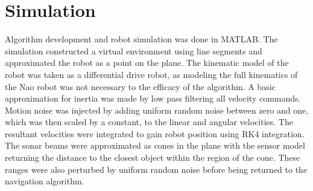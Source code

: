 \chapter{Simulation}
Algorithm development and robot simulation was done in MATLAB. The simulation constructed a virtual environment using line segments and approximated the robot as a point on the plane. The kinematic model of the robot was taken as a differential drive robot, as modeling the full kinematics of the Nao robot was not necessary to the efficacy of the algorithm. A basic approximation for inertia was made by low pass filtering all velocity commands. Motion noise was injected by adding uniform random noise between zero and one, which was then scaled by a constant, to the linear and angular velocities. The resultant velocities were integrated to gain robot position using RK4 integration.
The sonar beams were approximated as cones in the plane with the sensor model returning the distance to the closest object within the region of the cone. These ranges were also perturbed by uniform random noise before being returned to the navigation algorithm.